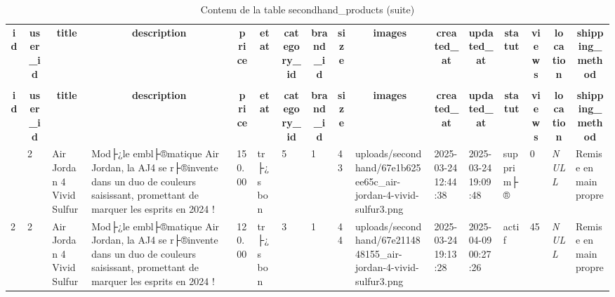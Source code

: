 %
%
 \begin{longtable}{|l|l|l|l|l|l|l|l|l|l|l|l|l|l|l|l|} 
 \hline \endhead \hline \endfoot \hline 
 \caption{Contenu de la table secondhand\_products} \label{tab:secondhand_products-data} \\\hline \multicolumn{1}{|c|}{\textbf{id}} & \multicolumn{1}{|c|}{\textbf{user\_id}} & \multicolumn{1}{|c|}{\textbf{title}} & \multicolumn{1}{|c|}{\textbf{description}} & \multicolumn{1}{|c|}{\textbf{price}} & \multicolumn{1}{|c|}{\textbf{etat}} & \multicolumn{1}{|c|}{\textbf{category\_id}} & \multicolumn{1}{|c|}{\textbf{brand\_id}} & \multicolumn{1}{|c|}{\textbf{size}} & \multicolumn{1}{|c|}{\textbf{images}} & \multicolumn{1}{|c|}{\textbf{created\_at}} & \multicolumn{1}{|c|}{\textbf{updated\_at}} & \multicolumn{1}{|c|}{\textbf{statut}} & \multicolumn{1}{|c|}{\textbf{views}} & \multicolumn{1}{|c|}{\textbf{location}} & \multicolumn{1}{|c|}{\textbf{shipping\_method}} \\ \hline \hline  \endfirsthead 
\caption{Contenu de la table secondhand\_products (suite)} \\ \hline \multicolumn{1}{|c|}{\textbf{id}} & \multicolumn{1}{|c|}{\textbf{user\_id}} & \multicolumn{1}{|c|}{\textbf{title}} & \multicolumn{1}{|c|}{\textbf{description}} & \multicolumn{1}{|c|}{\textbf{price}} & \multicolumn{1}{|c|}{\textbf{etat}} & \multicolumn{1}{|c|}{\textbf{category\_id}} & \multicolumn{1}{|c|}{\textbf{brand\_id}} & \multicolumn{1}{|c|}{\textbf{size}} & \multicolumn{1}{|c|}{\textbf{images}} & \multicolumn{1}{|c|}{\textbf{created\_at}} & \multicolumn{1}{|c|}{\textbf{updated\_at}} & \multicolumn{1}{|c|}{\textbf{statut}} & \multicolumn{1}{|c|}{\textbf{views}} & \multicolumn{1}{|c|}{\textbf{location}} & \multicolumn{1}{|c|}{\textbf{shipping\_method}} \\ \hline \hline \endhead \endfoot
1 & 2 & Air Jordan 4 Vivid Sulfur & Mod├¿le embl├®matique Air Jordan, la AJ4  se r├®invente dans un duo de couleurs saisissant, promettant de marquer les esprits en 2024 ! & 150.00 & tr├¿s bon & 5 & 1 & 43 & uploads/secondhand/67e1b625ee65c\_air-jordan-4-vivid-sulfur3.png & 2025-03-24 12:44:38 & 2025-03-24 19:09:48 & supprim├® & 0 & \textit{NULL} & Remise en main propre \\ \hline 
2 & 2 & Air Jordan 4 Vivid Sulfur & Mod├¿le embl├®matique Air Jordan, la AJ4 se r├®invente dans un duo de couleurs saisissant, promettant de marquer les esprits en 2024 ! & 120.00 & tr├¿s bon & 3 & 1 & 44 & uploads/secondhand/67e2114848155\_air-jordan-4-vivid-sulfur3.png & 2025-03-24 19:13:28 & 2025-04-09 00:27:26 & actif & 45 & \textit{NULL} & Remise en main propre \\ \hline 

\end{longtable}
